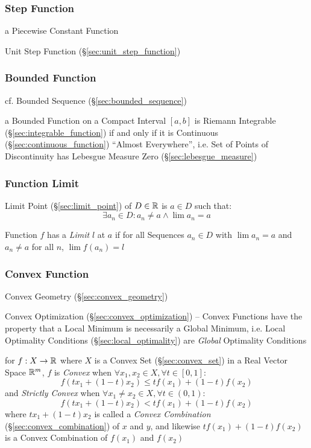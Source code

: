 \subsubsection{Step Function}\label{sec:step_function}

a Piecewise Constant Function

Unit Step Function (\S\ref{sec:unit_step_function})



\subsubsection{Bounded Function}\label{sec:bounded_function}

\fist cf. Bounded Sequence (\S\ref{sec:bounded_sequence})

a Bounded Function on a Compact Interval $[a,b]$ is Riemann Integrable
(\S\ref{sec:integrable_function}) if and only if it is Continuous
(\S\ref{sec:continuous_function}) ``Almost Everywhere'', i.e. Set of Points of
Discontinuity has Lebesgue Measure Zero (\S\ref{sec:lebesgue_measure})



\subsubsection{Function Limit}\label{sec:function_limit}

Limit Point (\S\ref{sec:limit_point}) of $D \in \mathbb{R}$ is $a \in D$
such that:
\[
  \exists a_n \in D : a_n \neq a \wedge \lim a_n = a
\]

Function $f$ has a \emph{Limit} $l$ at $a$ if for all Sequences $a_n
\in D$ with $\lim a_n = a$ and $a_n \neq a$ for all $n$, $\lim f(a_n)
= l$



\subsubsection{Convex Function}\label{sec:convex_function}

\fist Convex Geometry (\S\ref{sec:convex_geometry})

\fist Convex Optimization (\S\ref{sec:convex_optimization}) -- Convex Functions
have the property that a Local Minimum is necessarily a Global Minimum, i.e.
Local Optimality Conditions (\S\ref{sec:local_optimality}) are \emph{Global}
Optimality Conditions

for $f : X \rightarrow \mathbb{R}$ where $X$ is a Convex Set
(\S\ref{sec:convex_set}) in a Real Vector Space $\mathbb{R}^m$, $f$ is
\emph{Convex} when $\forall x_1, x_2 \in X, \forall t \in [0,1]$:
\[
  f(tx_1 + (1-t)x_2) \leq tf(x_1) + (1-t)f(x_2)
\]
and \emph{Strictly Convex} when $\forall x_1 \neq x_2 \in X, \forall t \in
(0,1)$:
\[
  f(tx_1 + (1-t)x_2) < tf(x_1) + (1-t)f(x_2)
\]
where $tx_1 + (1-t)x_2$ is called a \emph{Convex Combination}
(\S\ref{sec:convex_combination}) of $x$ and $y$, and likewise $tf(x_1) +
(1-t)f(x_2)$ is a Convex Combination of $f(x_1)$ and $f(x_2)$

